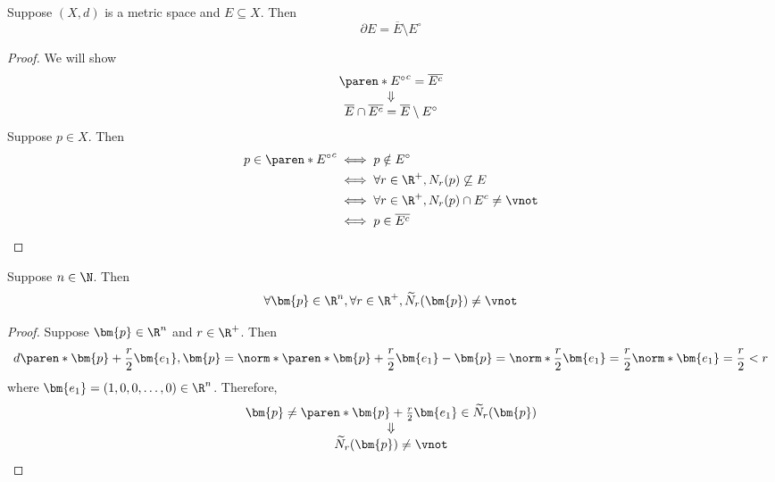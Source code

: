 \bigskip

\begin{theorem}
  Suppose $(X, d)$ is a metric space and $E \subseteq X$. Then
  \[
    \partial E = \overline{E} \setminus E^{\circ}
  \]
\end{theorem}

\begin{proof}
  We will show
  \[
    \begin{array}{c}
      \paren*{E^{\circ}}^{c} = \overline{E^{c}} \\
      \Downarrow                                \\
      \overline{E} \cap \overline{E^{c}} = \overline{E} \setminus E^{\circ}
    \end{array}
  \]
  Suppose $p \in X$. Then
  \begin{align*}
    p \in \paren*{E^{\circ}}^{c} & \iff p \notin E^{\circ}                                   \\
                                 & \iff \forall r \in \R^{+}, N_{r}(p) \not\subseteq E       \\
                                 & \iff \forall r \in \R^{+}, N_{r}(p) \cap E^{c} \neq \vnot \\
                                 & \iff p \in \overline{E^{c}}
  \end{align*}
\end{proof}

\bigskip

\begin{lemma} \label{an:lem:deleted-neighborhood-in-rn-is-non-empty}
  Suppose $n \in \N$. Then
  \[
    \forall \bm{p} \in \R^{n}, \forall r \in \R^{+}, \widetilde{N}_r(\bm{p}) \neq \vnot
  \]
\end{lemma}

\begin{proof}
  Suppose $\bm{p} \in \R^{n}$ and $r \in \R^{+}$. Then
  \[
    d\paren*{\bm{p} + \frac{r}{2} \bm{e_{1}}, \bm{p}} = \norm*{\paren*{\bm{p} + \frac{r}{2} \bm{e_{1}}}
      - \bm{p}} = \norm*{\frac{r}{2} \bm{e_{1}}} = \frac{r}{2} \norm*{\bm{e_{1}}} = \frac{r}{2} < r
  \]
  where $\bm{e_{1}} = (1, 0, 0, \dots, 0) \in \R^{n}$. Therefore,
  \[
    \begin{array}{c}
      \bm{p} \neq \paren*{\bm{p} + \frac{r}{2} \bm{e_{1}}} \in \widetilde{N}_r(\bm{p}) \\
      \Downarrow                                                                       \\
      \widetilde{N}_r(\bm{p}) \neq \vnot
    \end{array}
  \]
\end{proof}

